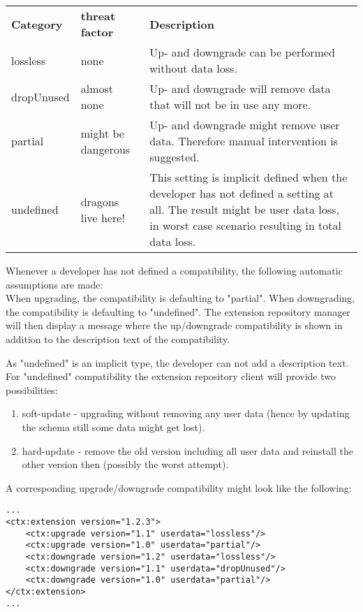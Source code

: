 \begin{tabular}{llp{}}\\
\textbf{Category} & \textbf{threat factor} & \textbf{Description}\\
lossless  & none & Up- and downgrade can be performed without data loss.\\
dropUnused  & almost none & Up- and downgrade will remove data that will not be in use any more.\\
partial  & might be dangerous & Up- and downgrade might remove user data. Therefore manual intervention is suggested.\\
undefined & dragons live here! &This setting is implicit defined when the developer has not defined a setting at all. The result might be user data loss, in worst case scenario resulting in total data loss.\\
\end{tabular}

Whenever a developer has not defined a compatibility, the following automatic assumptions are made:\\
When upgrading, the compatibility is defaulting to "partial".
When downgrading, the compatibility is defaulting to "undefined".
The extension repository manager will then display a message where the up/downgrade compatibility is shown in addition to the description text of the compatibility.

As "undefined" is an implicit type, the developer can not add a description text. For "undefined" compatibility the extension repository client will provide two possibilities:
\begin{enumerate}
\item soft-update - upgrading without removing any user data (hence by updating the schema still some data might get lost).
\item hard-update - remove the old version including all user data and reinstall the other version then (possibly the worst attempt).
\end{enumerate}

A corresponding upgrade/downgrade compatibility might look like the following:
\lstset{language=XML} 
\begin{lstlisting}[caption=XML example: upgrade/downgrade compatibility]
...
<ctx:extension version="1.2.3">
    <ctx:upgrade version="1.1" userdata="lossless"/>
    <ctx:upgrade version="1.0" userdata="partial"/>
    <ctx:downgrade version="1.2" userdata="lossless"/>
    <ctx:downgrade version="1.1" userdata="dropUnused"/>
    <ctx:downgrade version="1.0" userdata="partial"/>
</ctx:extension>
...
\end{lstlisting}

